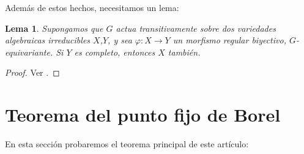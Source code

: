 \documentclass[spanish,10pt]{amsart}
\newtheorem{lemma}[theorem]{Lema}
\theoremstyle{definition}
\theoremstyle{remark}
\numberwithin{equation}{section}
\begin{document}
Además de estos hechos, necesitamos un lema:

\begin{lemma}\label{lema:lema para variedades completas}
Supongamos que $G$ actua transitivamente sobre dos variedades algebraicas irreducibles $X$,$Y$, y sea $\varphi : X \to Y$ un morfismo regular biyectivo, $G$-equivariante. Si $Y$ es completo, entonces $X$ también.
\end{lemma}
\begin{proof}
Ver \cite[Lema \S 21.1.]{humphreys2012linearAlgebraicGroups}.
\end{proof}


\section{Teorema del punto fijo de Borel}

En esta sección probaremos el teorema principal de este artículo:
\end{document}
